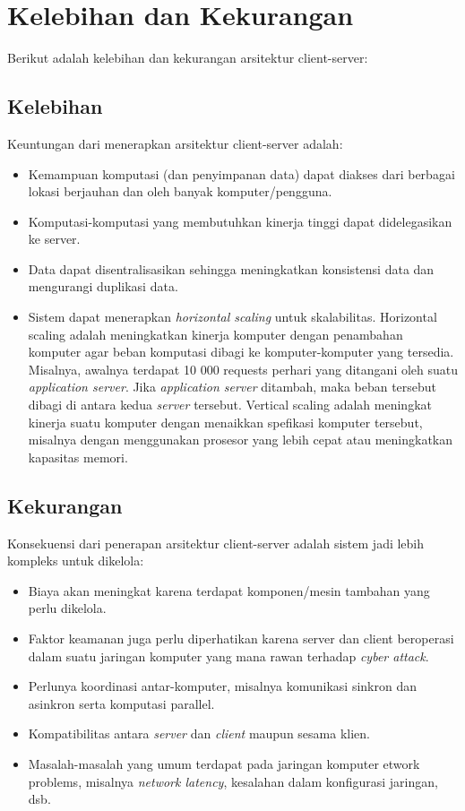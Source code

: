 \section{Kelebihan dan Kekurangan}
Berikut adalah kelebihan dan kekurangan arsitektur client-server:

\subsection{Kelebihan}
Keuntungan dari menerapkan arsitektur client-server adalah:
\begin{itemize}
\item Kemampuan komputasi (dan penyimpanan data) dapat diakses dari berbagai lokasi berjauhan dan oleh banyak komputer/pengguna.
\item Komputasi-komputasi yang membutuhkan kinerja tinggi dapat didelegasikan ke server.
\item Data dapat disentralisasikan sehingga meningkatkan konsistensi data dan mengurangi duplikasi data.
\item  Sistem dapat menerapkan \textit{horizontal scaling }untuk skalabilitas. Horizontal scaling adalah meningkatkan kinerja komputer dengan penambahan komputer agar beban komputasi dibagi ke komputer-komputer yang tersedia. Misalnya, awalnya terdapat 10 000 requests perhari yang ditangani oleh suatu \textit{application server}. Jika \textit{application server} ditambah, maka beban tersebut dibagi di antara kedua \textit{server} tersebut. Vertical scaling adalah meningkat kinerja suatu komputer dengan menaikkan spefikasi komputer tersebut, misalnya dengan menggunakan prosesor yang lebih cepat atau meningkatkan kapasitas memori.
\end{itemize}

\subsection{Kekurangan}
Konsekuensi dari penerapan arsitektur client-server adalah sistem jadi lebih kompleks untuk dikelola:
\begin{itemize}
\item Biaya akan meningkat karena terdapat komponen/mesin tambahan yang perlu dikelola.
\item Faktor keamanan juga perlu diperhatikan karena server dan client beroperasi dalam suatu jaringan komputer yang mana rawan terhadap \textit{cyber attack}.
\item Perlunya koordinasi antar-komputer, misalnya komunikasi sinkron dan asinkron serta komputasi parallel.
\item Kompatibilitas antara \textit{server} dan \textit{client} maupun sesama klien.
\item Masalah-masalah yang umum terdapat pada jaringan komputer etwork problems, misalnya \textit{network latency}, kesalahan dalam konfigurasi jaringan, dsb.
\end{itemize}

